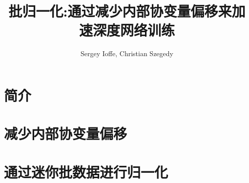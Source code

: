 \documentclass{ctexart}
\title{批归一化:通过减少内部协变量偏移来加速深度网络训练}
\author{Sergey Ioffe, Christian Szegedy}
\date{}
\begin{document}
\maketitle
\begin{abstract}
    
\end{abstract}
\section{简介}

\section{减少内部协变量偏移}

\section{通过迷你批数据进行归一化}

\printbibliography
\end{document}
